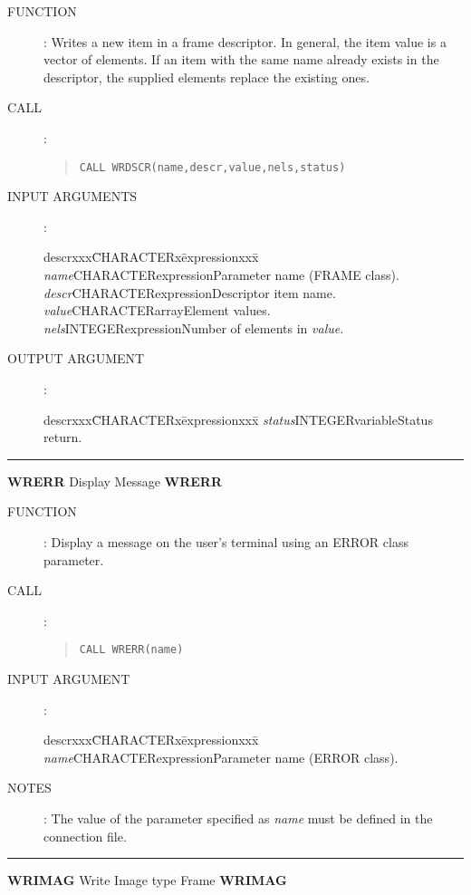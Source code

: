 \begin{description}
\item [FUNCTION]:
Writes a new item in a frame descriptor.
In general, the item value is a vector of elements.
If an item with the same name already exists in the descriptor, the supplied
elements replace the existing ones.
\item [CALL]:
\begin{quote}
{\tt CALL WRDSCR(name,descr,value,nels,status)}
\end{quote}
\item [INPUT ARGUMENTS]:
\begin{tabbing}
descrxxx\=CHARACTERx\=expressionxxx\=\kill
{\em name}\>CHARACTER\>expression\>Parameter name (FRAME class).\\
{\em descr}\>CHARACTER\>expression\>Descriptor item name.\\
{\em value}\>CHARACTER\>array\>Element values.\\
{\em nels}\>INTEGER\>expression\>Number of elements in {\em value}.
\end{tabbing}
\item [OUTPUT ARGUMENT]:
\begin{tabbing}
descrxxx\=CHARACTERx\=expressionxxx\=\kill
{\em status}\>INTEGER\>variable\>Status return.
\end{tabbing}
\end{description}
\rule{\textwidth}{0.3mm}
{\Large {\bf WRERR} \hfill Display Message \hfill {\bf WRERR}}
\begin{description}
\item [FUNCTION]:
Display a message on the user's terminal using an ERROR class parameter.
\item [CALL]:
\begin{quote}
{\tt CALL WRERR(name)}
\end{quote}
\item [INPUT ARGUMENT]:
\begin{tabbing}
descrxxx\=CHARACTERx\=expressionxxx\=\kill
{\em name}\>CHARACTER\>expression\>Parameter name (ERROR class).
\end{tabbing}
\item [NOTES]:
The value of the parameter specified as {\em name} must be defined in the connection
file.
\end{description}
\rule{\textwidth}{0.3mm}
{\Large {\bf WRIMAG} \hfill Write Image type Frame \hfill {\bf WRIMAG}}
